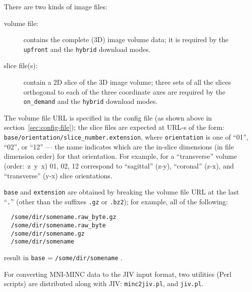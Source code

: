 There are two kinds of image files: 
\begin{description}
\item[volume file:] contains the complete (3D) image volume data; it
  is required by the \verb+upfront+ and the \verb+hybrid+ download
  modes.
\item[slice file(s):] contain a 2D slice of the 3D image volume; three
  sets of all the slices orthogonal to each of the three coordinate
  axes are required by the \verb+on_demand+ and the \verb+hybrid+
  download modes.
\end{description}
The volume file URL is specified in the config file (as shown above in
section~\ref{sec:config-file}); the slice files are expected at URL-s
of the form: \texttt{base/orientation/slice\_number.extension}, where
\texttt{orientation} is one of ``01'', ``02'', or ``12'' --- the name
indicates which are the in-slice dimensions (in file dimension order)
for that orientation. For example, for a ``transverse'' volume
(\mbox{order: z y x}) 01, 02, 12 correspond to ``sagittal'' (z-y),
``coronal'' (z-x), and ``transverse'' (y-x) slice orientations.

\texttt{base} and \texttt{extension} are obtained by breaking the
volume file URL at the last ``\verb+.+'' (other than the suffixes
\verb+.gz+ or \verb+.bz2+); for example, all of the following:
\begin{verbatim}
  /some/dir/somename.raw_byte.gz
  /some/dir/somename.raw_byte
  /some/dir/somename.gz
  /some/dir/somename
\end{verbatim}
result in \texttt{base} = \texttt{/some/dir/somename} .

For converting MNI-MINC data to the JIV input format, two utilities
(Perl scripts) are distributed along with JIV: \verb+minc2jiv.pl+, and
\verb+jiv.pl+.


